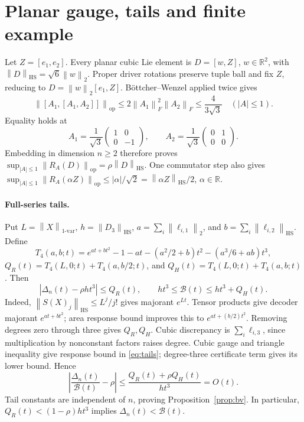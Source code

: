 \documentclass[11pt,a4paper]{article}
\newcommand{\HS}{\mathrm{HS}}
\newcommand{\op}{\mathrm{op}}
\newcommand{\R}{\mathbb R}
\newcommand{\B}{\mathcal B}
\newcommand{\Del}{\Delta}
\newcommand{\norm}[1]{\left\lVert#1\right\rVert}
\begin{document}
\clearpage
\appendix
\section{Planar gauge, tails and finite example}\label{app:planar}
Let \(Z=[e_1,e_2]\). Every planar cubic Lie element is \(D=[w,Z]\),
\(w\in\R^2\), with \(\norm{D}_{\HS}=\sqrt6\norm{w}_2\).
Proper driver rotations preserve tuple ball and fix \(Z\), reducing to
\(D=\norm{w}_2[e_1,Z]\). B\"ottcher--Wenzel applied twice gives
\[
 \norm{[A_1,[A_1,A_2]]}_{\op}
 \le2\norm{A_1}_F^2\norm{A_2}_F\le\frac4{3\sqrt3}\quad(|A|\le1).
\]
Equality holds at
\[
 A_1=\frac1{\sqrt3}\begin{pmatrix}1&0\\0&-1\end{pmatrix},\qquad
 A_2=\frac1{\sqrt3}\begin{pmatrix}0&1\\0&0\end{pmatrix}.
\]
Embedding in dimension \(n\ge2\) therefore proves
\(\sup_{|A|\le1}\norm{R_A(D)}_{\op}=\rho\norm{D}_{\HS}\).
One commutator step also gives
\(\sup_{|A|\le1}\norm{R_A(\alpha Z)}_{\op}
 \le|\alpha|/\sqrt2=\norm{\alpha Z}_{\HS}/2\), \(\alpha\in\R\).

\paragraph{Full-series tails.}
Put \(L=\norm{X}_{1\text{-var}}\), \(h=\norm{D_3}_{\HS}\),
\(a=\sum_i\norm{\ell_{i,1}}_2\), and
\(b=\sum_i\norm{\ell_{i,2}}_{\HS}\). Define
\[
 T_4(a,b;t)=e^{at+bt^2}-1-at-(a^2/2+b)t^2-(a^3/6+ab)t^3,
\]
\(Q_R(t)=T_4(L,0;t)+T_4(a,b/2;t)\), and
\(Q_H(t)=T_4(L,0;t)+T_4(a,b;t)\). Then
\begin{equation}\label{eq:tails}
 |\Del_n(t)-\rho ht^3|\le Q_R(t),\qquad
 ht^3\le\B(t)\le ht^3+Q_H(t).
\end{equation}
Indeed, \(\norm{S(X)_j}_{\HS}\le L^j/j!\) gives majorant \(e^{Lt}\).
Tensor products give decoder majorant \(e^{at+bt^2}\); area response bound
improves this to \(e^{at+(b/2)t^2}\). Removing degrees zero through three
gives \(Q_R,Q_H\). Cubic discrepancy is \(\sum_i\ell_{i,3}\), since
multiplication by nonconstant factors raises degree. Cubic gauge and triangle
inequality give response bound in \eqref{eq:tails}; degree-three certificate
term gives its lower bound. Hence
\[
 \left|\frac{\Del_n(t)}{\B(t)}-\rho\right|
 \le\frac{Q_R(t)+\rho Q_H(t)}{ht^3}=O(t).
\]
Tail constants are independent of \(n\), proving Proposition~\ref{prop:bv}.
In particular, \(Q_R(t)<(1-\rho)ht^3\) implies \(\Del_n(t)<\B(t)\).
\end{document}
